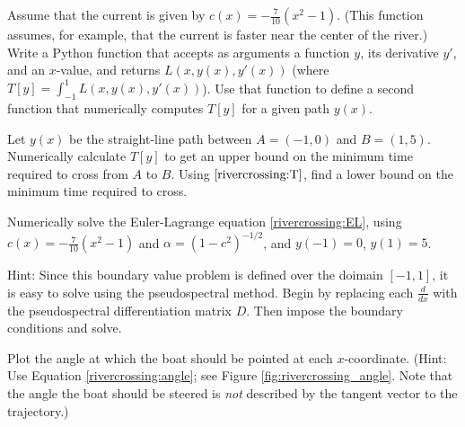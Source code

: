 
Assume that the current is given by $c(x) = -\frac{7}{10}(x^2-1)$. (This function assumes, for example, that the current is faster near the center of the river.)
Write a Python function that accepts as arguments a function $y$, its derivative $y'$, and an $x$-value, and returns $L(x,y(x),y'(x))$ (where $T[y] = \int_{-1}^1 L(x,y(x),y'(x))$). Use that function to define a second function that numerically computes $T[y]$ for a given path $y(x)$. 

	Let $y(x)$ be the straight-line path between $A = (-1,0)$ and $B=(1,5)$. Numerically calculate $T[y]$ to get an upper bound on the minimum time required to cross from $A$ to $B$. Using $\eqref{rivercrossing:T}$, find a lower bound on the minimum time required to cross.

Numerically solve the Euler-Lagrange equation \eqref{rivercrossing:EL}, using $c(x) = -\frac{7}{10}(x^2-1)$ and $\alpha = (1-c^2)^{-1/2}$, and $y(-1) = 0$, $y(1) = 5$. 

Hint: Since this boundary value problem is defined over the doimain $[-1,1]$, it is easy to solve using the pseudospectral method. Begin by replacing each $\frac{d}{dx}$ with the pseudospectral differentiation matrix $D$. Then impose the boundary conditions and solve.

Plot the angle at which the boat should be pointed at each $x$-coordinate. (Hint: Use  Equation \eqref{rivercrossing:angle}; see Figure \ref{fig:rivercrossing_angle}. Note that the angle the boat should be steered is \emph{not} described by the tangent vector to the trajectory.)


